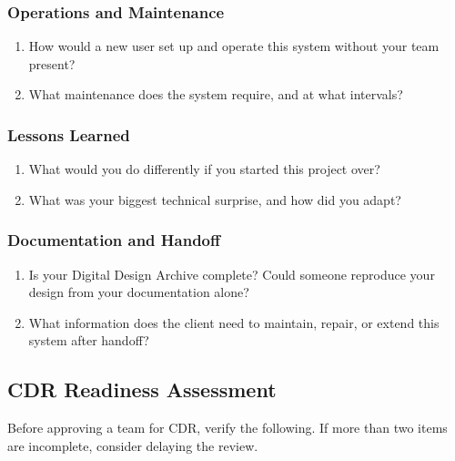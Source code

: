 \subsubsection*{Operations and Maintenance}
\begin{enumerate}[nosep,leftmargin=1.5em,start=7]
\item How would a new user set up and operate this system without your team present?
\item What maintenance does the system require, and at what intervals?
\end{enumerate}

\subsubsection*{Lessons Learned}
\begin{enumerate}[nosep,leftmargin=1.5em,start=9]
\item What would you do differently if you started this project over?
\item What was your biggest technical surprise, and how did you adapt?
\end{enumerate}

\subsubsection*{Documentation and Handoff}
\begin{enumerate}[nosep,leftmargin=1.5em,start=11]
\item Is your Digital Design Archive complete? Could someone reproduce your design from your documentation alone?
\item What information does the client need to maintain, repair, or extend this system after handoff?
\end{enumerate}

\subsection{CDR Readiness Assessment}

Before approving a team for CDR, verify the following. If more than two items are incomplete, consider delaying the review.

